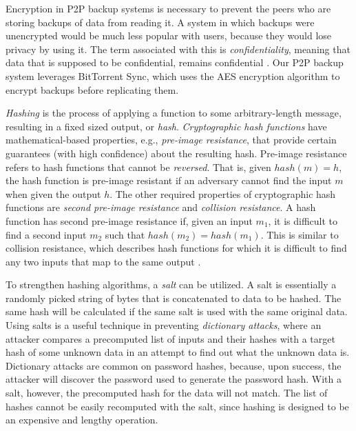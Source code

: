 \documentclass[12pt]{report}
\begin{document}
Encryption in P2P backup systems is necessary to prevent the peers who are storing backups of data from reading it. A system in which backups were unencrypted would be much less popular with users, because they would lose privacy by using it. The term associated with this is \textit{confidentiality}, meaning that data that is supposed to be confidential, remains confidential \cite{OWASPCrypto}. Our P2P backup system leverages BitTorrent Sync, which uses the AES encryption algorithm to encrypt backups before replicating them.

\textit{Hashing} is the process of applying a function to some arbitrary-length message, resulting in a fixed sized output, or \textit{hash}. \textit{Cryptographic hash functions} have mathematical-based properties, e.g., \textit{pre-image resistance}, that provide certain guarantees (with high confidence) about the resulting hash. Pre-image resistance refers to hash functions that cannot be \textit{reversed}. That is, given $hash(m) = h$, the hash function is pre-image resistant if an adversary cannot find the input $m$ when given the output $h$. The other required properties of cryptographic hash functions are \textit{second pre-image resistance} and \textit{collision resistance}. A hash function has second pre-image resistance if, given an input $m_1$, it is difficult to find a second input $m_2$ such that $hash(m_2) = hash(m_1)$. This is similar to collision resistance, which describes hash functions for which it is difficult to find any two inputs that map to the same output \cite{CryptoHashFunctions}.

To strengthen hashing algorithms, a \textit{salt} can be utilized. A salt is essentially a randomly picked string of bytes that is concatenated to data to be hashed. The same hash will be calculated if the same salt is used with the same original data. Using salts is a useful technique in preventing \textit{dictionary attacks}, where an attacker compares a precomputed list of inputs and their hashes with a target hash of some unknown data in an attempt to find out what the unknown data is. Dictionary attacks are common on password hashes, because, upon success, the attacker will discover the password used to generate the password hash. With a salt, however, the precomputed hash for the data will not match. The list of hashes cannot be easily recomputed with the salt, since hashing is designed to be an expensive and lengthy operation.
\end{document}
